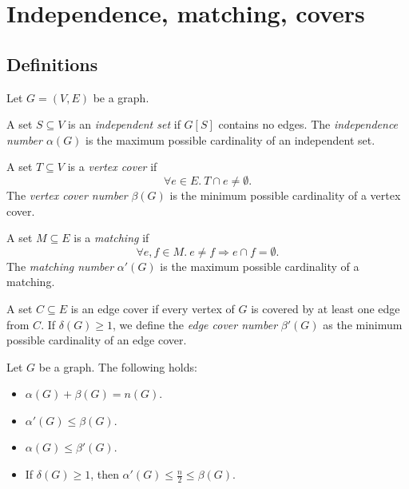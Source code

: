 \section{Independence, matching, covers}

\subsection{Definitions}


Let $G = (V, E)$ be a graph.

\begin{definition}
    A set $S \subseteq V$ is an \emph{independent set} if $G[S]$ contains no edges.
    The \emph{independence number $\alpha(G)$} is the maximum possible cardinality of an independent set.
\end{definition}

\begin{definition}
    A set $T \subseteq V$ is a \emph{vertex cover} if 
    \[
        \forall e \in E.~T\cap e \neq \emptyset.
    \]
    The \emph{vertex cover number} $\beta(G)$ is the minimum 
    possible cardinality of a vertex cover.
\end{definition}

\begin{definition}
    A set $M \subseteq E$ is a \emph{matching} if
    \[
        \forall e,f \in M.~e \neq f \Rightarrow e \cap f = \emptyset.
    \]
    The \emph{matching number} $\alpha'(G)$ is 
    the maximum possible cardinality of a matching.
\end{definition}

\begin{definition}
    A set $C \subseteq E$ is an edge cover if every vertex of $G$ is covered 
    by at least one edge from $C$. If $\delta(G) \ge 1$, we define the 
    \emph{edge cover number} $\beta'(G)$ as 
    the minimum possible cardinality of an edge cover.
\end{definition}

\begin{lemma}
    Let $G$ be a graph. The following holds:
    \begin{itemize}
        \item $\alpha(G) + \beta(G) = n(G)$.
        \item $\alpha'(G) \le \beta(G)$.
        \item $\alpha(G) \le \beta'(G)$.
        \item If $\delta(G) \ge 1$, then $\alpha'(G) \le \frac{n}{2} \le \beta(G)$.
    \end{itemize}
\end{lemma}

